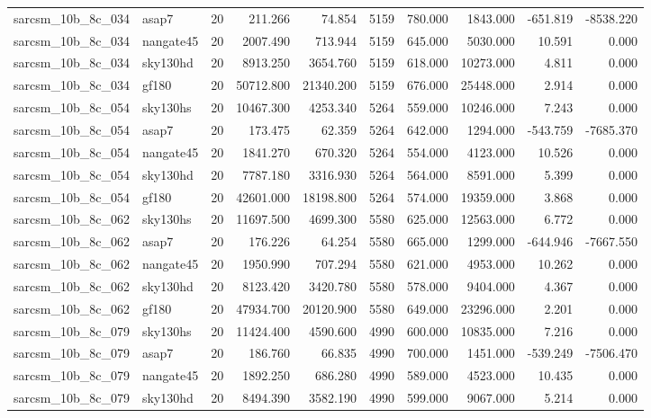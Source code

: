 \documentclass{article}
\begin{document}
\begin{longtable}{llrrrrrrrr}
sarcsm\_10b\_8c\_034 & asap7 & 20 & 211.266 & 74.854 & 5159 & 780.000 & 1843.000 & -651.819 & -8538.220 \\
sarcsm\_10b\_8c\_034 & nangate45 & 20 & 2007.490 & 713.944 & 5159 & 645.000 & 5030.000 & 10.591 & 0.000 \\
sarcsm\_10b\_8c\_034 & sky130hd & 20 & 8913.250 & 3654.760 & 5159 & 618.000 & 10273.000 & 4.811 & 0.000 \\
sarcsm\_10b\_8c\_034 & gf180 & 20 & 50712.800 & 21340.200 & 5159 & 676.000 & 25448.000 & 2.914 & 0.000 \\
sarcsm\_10b\_8c\_054 & sky130hs & 20 & 10467.300 & 4253.340 & 5264 & 559.000 & 10246.000 & 7.243 & 0.000 \\
sarcsm\_10b\_8c\_054 & asap7 & 20 & 173.475 & 62.359 & 5264 & 642.000 & 1294.000 & -543.759 & -7685.370 \\
sarcsm\_10b\_8c\_054 & nangate45 & 20 & 1841.270 & 670.320 & 5264 & 554.000 & 4123.000 & 10.526 & 0.000 \\
sarcsm\_10b\_8c\_054 & sky130hd & 20 & 7787.180 & 3316.930 & 5264 & 564.000 & 8591.000 & 5.399 & 0.000 \\
sarcsm\_10b\_8c\_054 & gf180 & 20 & 42601.000 & 18198.800 & 5264 & 574.000 & 19359.000 & 3.868 & 0.000 \\
sarcsm\_10b\_8c\_062 & sky130hs & 20 & 11697.500 & 4699.300 & 5580 & 625.000 & 12563.000 & 6.772 & 0.000 \\
sarcsm\_10b\_8c\_062 & asap7 & 20 & 176.226 & 64.254 & 5580 & 665.000 & 1299.000 & -644.946 & -7667.550 \\
sarcsm\_10b\_8c\_062 & nangate45 & 20 & 1950.990 & 707.294 & 5580 & 621.000 & 4953.000 & 10.262 & 0.000 \\
sarcsm\_10b\_8c\_062 & sky130hd & 20 & 8123.420 & 3420.780 & 5580 & 578.000 & 9404.000 & 4.367 & 0.000 \\
sarcsm\_10b\_8c\_062 & gf180 & 20 & 47934.700 & 20120.900 & 5580 & 649.000 & 23296.000 & 2.201 & 0.000 \\
sarcsm\_10b\_8c\_079 & sky130hs & 20 & 11424.400 & 4590.600 & 4990 & 600.000 & 10835.000 & 7.216 & 0.000 \\
sarcsm\_10b\_8c\_079 & asap7 & 20 & 186.760 & 66.835 & 4990 & 700.000 & 1451.000 & -539.249 & -7506.470 \\
sarcsm\_10b\_8c\_079 & nangate45 & 20 & 1892.250 & 686.280 & 4990 & 589.000 & 4523.000 & 10.435 & 0.000 \\
sarcsm\_10b\_8c\_079 & sky130hd & 20 & 8494.390 & 3582.190 & 4990 & 599.000 & 9067.000 & 5.214 & 0.000 \\

\end{longtable}
\end{document}

